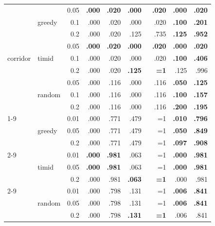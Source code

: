 \documentclass{article}
\begin{document}
\begin{table}[h]
\begin{tabular}{l@{\hskip 12pt} l@{\hskip 12pt} r@{\hskip 12pt} rr@{\hskip 12pt} rr@{\hskip 12pt} rr@{\hskip 12pt}}
\multirow{9}{*}{corridor} & \multirow{3}{*}{greedy} & 0.05 & \textbf{.000} & \textbf{.020} & \textbf{.000} & \textbf{.020} & \textbf{.000} & \textbf{.020} \\
 &  & 0.1 & .000 & .020 & .000 & .020 & \textbf{.100} & \textbf{.201} \\
 &  & 0.2 & .000 & .020 & .125 & .735 & \textbf{.125} & \textbf{.952} \\
 \cmidrule(lr){2-9}
 & \multirow{3}{*}{timid} & 0.05 & \textbf{.000} & \textbf{.020} & \textbf{.000} & \textbf{.020} & \textbf{.000} & \textbf{.020} \\
 &  & 0.1 & .000 & .020 & .000 & .020 & \textbf{.100} & \textbf{.406} \\
 &  & 0.2 & .000 & .020 & \textbf{.125} & \textbf{~~{=}1} & .125 & .996 \\
 \cmidrule(lr){2-9}
 & \multirow{3}{*}{random} & 0.05 & .000 & .116 & .000 & .116 & \textbf{.050} & \textbf{.125} \\
 &  & 0.1 & .000 & .116 & .000 & .116 & \textbf{.100} & \textbf{.157} \\
 &  & 0.2 & .000 & .116 & .000 & .116 & \textbf{.200} & \textbf{.195} \\
 \cmidrule(lr){1-9}
\multirow{9}{*}{dpm} & \multirow{3}{*}{greedy} & 0.01 & .000 & .771 & \cellcolor{red!20}.479 & \cellcolor{red!20}~~{=}1 & \textbf{.010} & \textbf{.796} \\
 &  & 0.05 & .000 & .771 & \cellcolor{red!20}.479 & \cellcolor{red!20}~~{=}1 & \textbf{.050} & \textbf{.849} \\
 &  & 0.2 & .000 & .771 & \cellcolor{red!20}.479 & \cellcolor{red!20}~~{=}1 & \textbf{.097} & \textbf{.908} \\
 \cmidrule(lr){2-9}
 & \multirow{3}{*}{timid} & 0.01 & \textbf{.000} & \textbf{.981} & \cellcolor{red!20}.063 & \cellcolor{red!20}~~{=}1 & \textbf{.000} & \textbf{.981} \\
 &  & 0.05 & \textbf{.000} & \textbf{.981} & \cellcolor{red!20}.063 & \cellcolor{red!20}~~{=}1 & \textbf{.000} & \textbf{.981} \\
 &  & 0.2 & .000 & .981 & \textbf{.063} & \textbf{~~{=}1} & .000 & .981 \\
 \cmidrule(lr){2-9}
 & \multirow{3}{*}{random} & 0.01 & .000 & .798 & \cellcolor{red!20}.131 & \cellcolor{red!20}~~{=}1 & \textbf{.006} & \textbf{.841} \\
 &  & 0.05 & .000 & .798 & \cellcolor{red!20}.131 & \cellcolor{red!20}~~{=}1 & \textbf{.006} & \textbf{.841} \\
 &  & 0.2 & .000 & .798 & \textbf{.131} & \textbf{~~{=}1} & .006 & .841 \\

\end{tabular}
\end{table}
\end{document}
